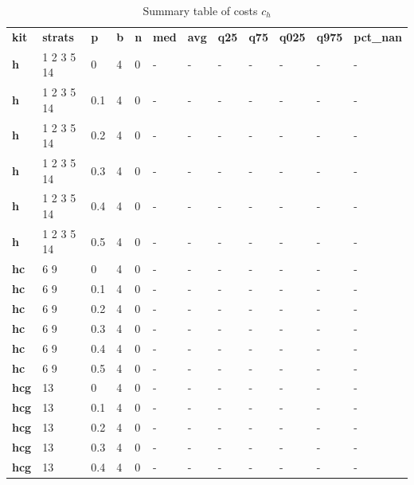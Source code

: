 \begin{longtable}[h]{|p{0.8cm}|p{1.5cm}|p{1cm}|p{1cm}|p{1cm}|p{1cm}|p{1cm}|p{1cm}|p{1cm}|p{1cm}|p{1cm}|p{1.5cm}|}
\caption{Summary table of costs $c_h$}
\label{tab:costs_mod_h} \\
      \hline
\textbf{ kit} & \textbf{ strats} & \textbf{ p} & \textbf{ b} & \textbf{ n} & \textbf{ med} & \textbf{ avg} & \textbf{ q25} & \textbf{ q75} & \textbf{ q025} & \textbf{ q975} & \textbf{ pct\_nan}
           \\
  \textbf{h   } &  1 2 3 5 14 &   0 & 4 & 0 & - & - & - & - & - & - & -
           \\
  \textbf{h   } &  1 2 3 5 14 & 0.1 & 4 & 0 & - & - & - & - & - & - & -
           \\
  \textbf{h   } &  1 2 3 5 14 & 0.2 & 4 & 0 & - & - & - & - & - & - & -
           \\
  \textbf{h   } &  1 2 3 5 14 & 0.3 & 4 & 0 & - & - & - & - & - & - & -
           \\
  \textbf{h   } &  1 2 3 5 14 & 0.4 & 4 & 0 & - & - & - & - & - & - & -
           \\
  \textbf{h   } &  1 2 3 5 14 & 0.5 & 4 & 0 & - & - & - & - & - & - & -
           \\
  \textbf{hc  } &  6 9        &   0 & 4 & 0 & - & - & - & - & - & - & -
           \\
  \textbf{hc  } &  6 9        & 0.1 & 4 & 0 & - & - & - & - & - & - & -
           \\
  \textbf{hc  } &  6 9        & 0.2 & 4 & 0 & - & - & - & - & - & - & -
           \\
  \textbf{hc  } &  6 9        & 0.3 & 4 & 0 & - & - & - & - & - & - & -
           \\
  \textbf{hc  } &  6 9        & 0.4 & 4 & 0 & - & - & - & - & - & - & -
           \\
  \textbf{hc  } &  6 9        & 0.5 & 4 & 0 & - & - & - & - & - & - & -
           \\
  \textbf{hcg } &  13         &   0 & 4 & 0 & - & - & - & - & - & - & -
           \\
  \textbf{hcg } &  13         & 0.1 & 4 & 0 & - & - & - & - & - & - & -
           \\
  \textbf{hcg } &  13         & 0.2 & 4 & 0 & - & - & - & - & - & - & -
           \\
  \textbf{hcg } &  13         & 0.3 & 4 & 0 & - & - & - & - & - & - & -
           \\
  \textbf{hcg } &  13         & 0.4 & 4 & 0 & - & - & - & - & - & - & -

\end{longtable}
